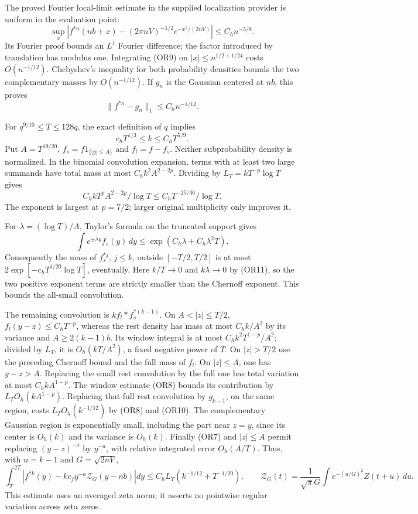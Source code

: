 \documentclass[11pt]{article}
\begin{document}
The proved Fourier local-limit estimate in the supplied localization
provider is uniform in the evaluation point:
\[
 \sup_x\left|f^{*n}(nb+x)
 -(2\pi nV)^{-1/2}e^{-x^2/(2nV)}\right|
 \leq C_h n^{-5/8}.                                  \tag{OR9}
\]
Its Fourier proof bounds an \(L^1\) Fourier difference; the factor
introduced by translation has modulus one.  Integrating (OR9) on
\(|x|\leq n^{1/2+1/24}\) costs \(O(n^{-1/12})\).
Chebyshev's inequality for both probability densities bounds the two
complementary masses by \(O(n^{-1/12})\).  If \(g_n\) is the Gaussian
centered at \(nb\), this proves
\[
 \|f^{*n}-g_n\|_1\leq C_h n^{-1/12}.                  \tag{OR10}
\]

For \(q^{9/10}\leq T\leq128q\), the exact definition of \(q\) implies
\[
 c_hT^{1/3}\leq k\leq C_hT^{5/9}.                    \tag{OR11}
\]
Put \(A=T^{19/20}\), \(f_s=f1_{\{|y|\leq A\}}\) and \(f_l=f-f_s\).
Neither subprobability density is normalized.  In the binomial
convolution expansion, terms with at least two large summands have
total mass at most \(C_hk^2A^{2-2p}\).  Dividing by
\(L_T=kT^{-p}\log T\) gives
\[
 C_h kT^pA^{2-2p}/\log T
 \leq C_hT^{-25/36}/\log T.                           \tag{OR12}
\]
The exponent is largest at \(p=7/2\); larger original multiplicity
only improves it.

For \(\lambda=(\log T)/A\), Taylor's formula on the truncated support
gives
\[
 \int e^{\pm\lambda y}f_s(y)\,dy
 \leq\exp(C_h\lambda+C_h\lambda^2T).
\]
Consequently the mass of \(f_s^{*j}\), \(j\leq k\), outside
\([-T/2,T/2]\) is at most
\(2\exp[-c_hT^{1/20}\log T]\), eventually.  Here
\(k/T\to0\) and \(k\lambda\to0\) by (OR11), so the two positive
exponent terms are strictly smaller than the Chernoff exponent.
This bounds the all-small convolution.

The remaining convolution is \(k f_l*f_s^{*(k-1)}\).
On \(A<|z|\leq T/2\), \(f_l(y-z)\leq C_hT^{-p}\), whereas the
rest density has mass at most \(C_h k/A^2\) by its variance and
\(A\geq2(k-1)b\).  Its window integral is at most
\(C_hk^2T^{1-p}/A^2\); divided by \(L_T\), it is
\(O_h(kT/A^2)\), a fixed negative power of \(T\).
On \(|z|>T/2\) use the preceding Chernoff bound and the full mass
of \(f_l\).  On \(|z|\leq A\), one has \(y-z>A\).
Replacing the small rest convolution by the full one has total
variation at most \(C_hkA^{1-p}\).  The window estimate (OR8) bounds
its contribution by \(L_TO_h(kA^{1-p})\).
Replacing that full rest convolution by \(g_{k-1}\), on the same
region, costs \(L_TO_h(k^{-1/12})\) by (OR8) and (OR10).
The complementary Gaussian region is exponentially small, including
the part near \(z=y\), since its center is \(O_h(k)\) and its
variance is \(O_h(k)\).
Finally (OR7) and \(|z|\leq A\) permit replacing
\((y-z)^{-a}\) by \(y^{-a}\), with relative integrated error
\(O_h(A/T)\).  Thus, with \(n=k-1\) and \(G=\sqrt{2nV}\),
\[
 \int_T^{2T}\left|f^{*k}(y)-kc_fy^{-a}\mathcal Z_G(y-nb)\right|dy
 \leq C_h L_T(k^{-1/12}+T^{-1/20}),\qquad
 \mathcal Z_G(t)=\frac1{\sqrt\pi G}\int e^{-(u/G)^2}Z(t+u)\,du .
 \tag{OR13}
\]
This estimate uses an averaged zeta norm; it asserts no pointwise
regular variation across zeta zeros.
\end{document}
